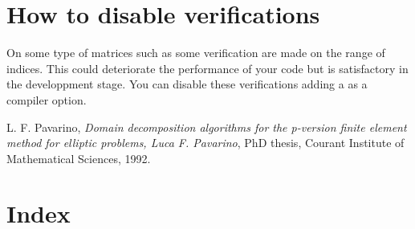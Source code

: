 \documentclass[11pt,a4paper]{article}
\begin{document}



\section{How to disable verifications}

On some type of matrices such as  some verification are made on the range of indices. This could deteriorate  the performance of your code but is satisfactory in the developpment stage. You can disable these verifications adding a  as a compiler option.


\begin{thebibliography}{99}
     L. F. {\texonly{\sc} Pavarino},
    {\it Domain decomposition algorithms for the p-version finite
         element method for elliptic problems, Luca F. Pavarino},
        PhD thesis, Courant Institute of Mathematical Sciences, 1992.
\end{thebibliography}

\section{Index}
\texorhtml{\printindex}{\label{gfmindex}\htmlprintindex}
\end{document}
